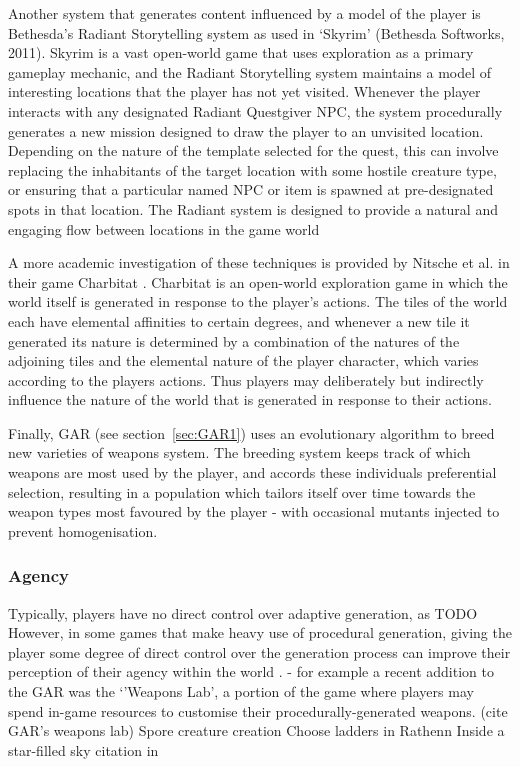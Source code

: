 \documentclass{acm_proc_article-sp}
\begin{document}
Another system that generates content influenced by a model of the player is Bethesda's Radiant Storytelling system \cite{radiant} as used in `Skyrim' (Bethesda Softworks, 2011). Skyrim is a vast open-world game that uses exploration as a primary gameplay mechanic, and the Radiant Storytelling system maintains a model of interesting locations that the player has not yet visited. Whenever the player interacts with any designated Radiant Questgiver NPC, the system procedurally generates a new mission designed to draw the player to an unvisited location. Depending on the nature of the template selected for the quest, this can involve replacing the inhabitants of the target location with some hostile creature type, or ensuring that a particular named NPC or item is spawned at pre-designated spots in that location. The Radiant system is designed to provide a natural and engaging flow between locations in the game world

A more academic investigation of these techniques is provided by Nitsche et al. in their game Charbitat \cite{charbitat}. Charbitat is an open-world exploration game in which the world itself is generated in response to the player's actions. The tiles of the world each have elemental affinities to certain degrees, and whenever a new tile it generated its nature is determined by a combination of the natures of the adjoining tiles and the elemental nature of the player character, which varies according to the players actions. Thus players may deliberately but indirectly influence the nature of the world that is generated in response to their actions.

\label{sec:GAR2}
Finally, GAR (see section~\ref{sec:GAR1}) uses an evolutionary algorithm to breed new varieties of weapons system. The breeding system keeps track of which weapons are most used by the player, and accords these individuals preferential selection, resulting in a population which tailors itself over time towards the weapon types most favoured by the player - with occasional mutants injected to prevent homogenisation.

\subsubsection{Agency}
Typically, players have no direct control over adaptive generation, as TODO \cite{hamlet}
However, in some games that make heavy use of procedural generation, giving the player some degree of direct control over the generation process can improve their perception of their agency within the world \cite{bartle2004designing}.
 - for example a recent addition to the GAR was the `'Weapons Lab', a portion of the game where players may spend in-game resources to customise their procedurally-generated weapons. (cite GAR's weapons lab)
Spore creature creation
Choose ladders in Rathenn \cite{smith2011pcg}
Inside a star-filled sky citation in \cite{smith2011pcg}
\end{document}
